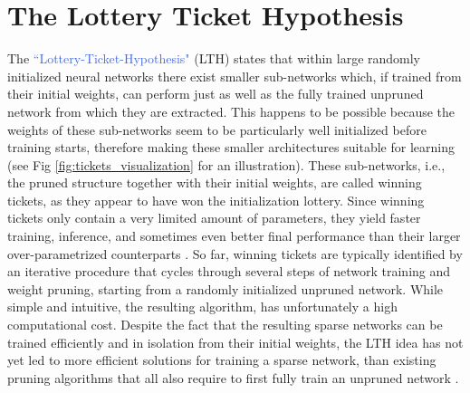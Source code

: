 \section{The Lottery Ticket Hypothesis}
\label{sec:intro}
The \textcolor{RoyalBlue}{``Lottery-Ticket-Hypothesis"} (LTH) \cite{frankle2018lottery} states that within large randomly initialized neural networks there exist smaller sub-networks which, if trained from their initial weights, can perform just as well as the fully trained unpruned network from which they are extracted. This happens to be possible because the weights of these sub-networks seem to be particularly well initialized before training starts, therefore making these smaller architectures suitable for learning (see Fig \ref{fig:tickets_visualization} for an illustration). These sub-networks, i.e., the pruned structure together with their initial weights, are called winning tickets, as they appear to have won the initialization lottery. Since winning tickets only contain a very limited amount of parameters, they yield faster training, inference, and sometimes even better final performance than their larger over-parametrized counterparts \cite{frankle2018lottery,franklestabilizing}. So far, winning tickets are typically identified by an iterative procedure that cycles through several steps of network training and weight pruning, starting from a randomly initialized unpruned network. While simple and intuitive, the resulting algorithm, has unfortunately a high computational cost. Despite the fact that the resulting sparse networks can be trained efficiently and in isolation from their initial weights, the LTH idea has not yet led to more efficient solutions for training a sparse network, than existing pruning algorithms that all also require to first fully train an unpruned network \cite{han2015deep,molchanov2016pruning,dong2017learning,lin2017runtime,zhuang2018discrimination}.

